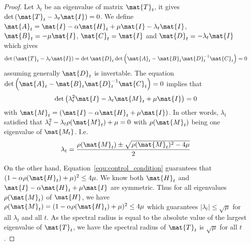 \begin{lemma}
\begin{proof}
Let $\lambda_t$ be an eigenvalue of matrix $\mat{T}_t$, it gives 
$\det\left(\mat{T}_t - \lambda_t \mat{I} \right) = 0$. 
We define $\mat{A}_t = \mat{I} - \alpha \mat{H}_t + \mu \mat{I} - \lambda_t \mat{I}$, $\mat{B}_t = -\mu \mat{I}$,
$\mat{C}_t = \mat{I}$ and $\mat{D}_t = -\lambda_t \mat{I}$ which gives
\[
\det \left( \mat{T}_t - \lambda_t \mat{I}\right) = \det{\mat{D}_t} \det{\left(\mat{A}_t - \mat{B}_t \mat{D}_t^{-1}
\mat{C}_t \right)} = 0
\]
assuming generally $\mat{D}_t$ is invertable. The equation $\det{\left(\mat{A}_t - \mat{B}_t \mat{D}_t^{-1}
\mat{C}_t \right)} = 0$ implies that
\begin{equation}
\det \left( \lambda_t^2\mat{I} - \lambda_t \mat{M}_t + \mu \mat{I} \right) = 0
\label{equ:control_condition_2}
\end{equation}
with $\mat{M}_t = \left( \mat{I} - \alpha \mat{H}_t + \mu \mat{I} \right)$. In other words, $\lambda_t$ satisfied that $\lambda_t^2 - \lambda_t \rho(\mat{M}_t) + \mu = 0$ with $\rho(\mat{M}_t)$ being one eigenvalue of $\mat{M_t}$. I.e.
\begin{equation}
	\lambda_t = \frac{\rho(\mat{M}_t) \pm \sqrt{\rho(\mat{M}_t)^2 - 4\mu}}{2}
\end{equation}

On the other hand, Equation~\eqref{equ:control_condition} guarantees that $(1 - \alpha \rho(\mat{H}_t) + \mu)^2 \leq 4\mu$. We know both $\mat{H}_t$ and $\mat{I} - \alpha \mat{H}_t + \mu \mat{I}$ are symmetric. Thus for all eigenvalues $\rho(\mat{M}_t)$ of $\mat{H}$, we have $\rho(\mat{M}_t) = (1 - \alpha \rho(\mat{H}_t) + \mu)^2 \leq 4\mu$ which guarantees $| \lambda_t | \leq \sqrt{\mu}$ for all $\lambda_t$ and all $t$. As the spectral radius is equal to the absolute value of the largest eigenvalue of $\mat{T}_t$, we have the spectral radius of $\mat{T}_t$ is $\sqrt{\mu}$ for all $t$.


\end{proof}
	
\end{lemma}


